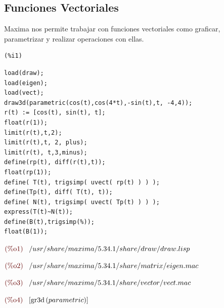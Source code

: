 \documentclass[12pt]{article}
\begin{document}
\subsection{Funciones Vectoriales}
Maxima nos permite trabajar con funciones vectoriales como graficar, parametrizar y realizar operaciones con ellas.

\noindent
\begin{minipage}[t]{8ex}{\color{red}\bf
\begin{verbatim}
(%i1) 
\end{verbatim}}
\end{minipage}
\begin{minipage}[t]{\textwidth}{\color{blue}
\begin{verbatim}
load(draw);
load(eigen);
load(vect);
draw3d(parametric(cos(t),cos(4*t),-sin(t),t, -4,4));
r(t) := [cos(t), sin(t), t];
float(r(1));
limit(r(t),t,2);
limit(r(t),t, 2, plus);
limit(r(t), t,3,minus);
define(rp(t), diff(r(t),t));
float(rp(1));
define( T(t), trigsimp( uvect( rp(t) ) ) );
define(Tp(t), diff( T(t), t));
define( N(t), trigsimp( uvect( Tp(t) ) ) );
express(T(t)~N(t));
define(B(t),trigsimp(%));
float(B(1));
\end{verbatim}}
\end{minipage}
\begin{math}\displaystyle
\parbox{8ex}{\color{labelcolor}(\%o1) }
/usr/share/maxima/5.34.1/share/draw/draw.lisp
\end{math}

\begin{math}\displaystyle
\parbox{8ex}{\color{labelcolor}(\%o2) }
/usr/share/maxima/5.34.1/share/matrix/eigen.mac
\end{math}

\begin{math}\displaystyle
\parbox{8ex}{\color{labelcolor}(\%o3) }
/usr/share/maxima/5.34.1/share/vector/vect.mac
\end{math}

\begin{math}\displaystyle
\parbox{8ex}{\color{labelcolor}(\%o4) }
[\mathrm{gr3d}\left( parametric\right) ]
\end{math}
\end{document}
